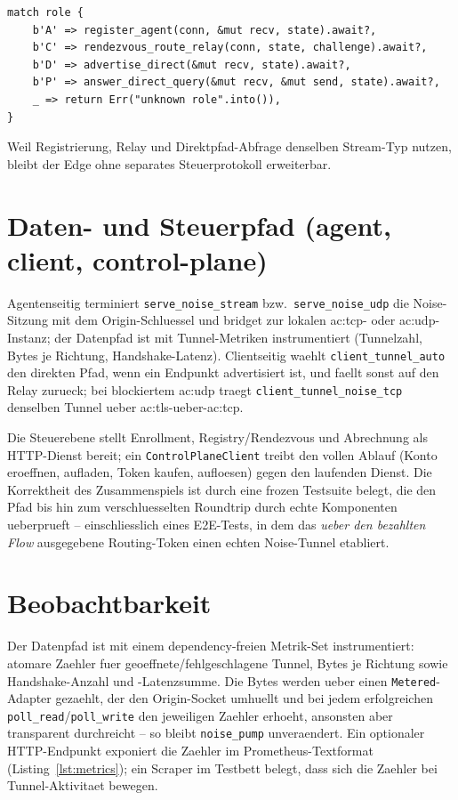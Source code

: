 \begin{lstlisting}[caption={Rollen-Dispatch (vereinfacht).},label=lst:dispatch]
match role {
    b'A' => register_agent(conn, &mut recv, state).await?,
    b'C' => rendezvous_route_relay(conn, state, challenge).await?,
    b'D' => advertise_direct(&mut recv, state).await?,
    b'P' => answer_direct_query(&mut recv, &mut send, state).await?,
    _ => return Err("unknown role".into()),
}
\end{lstlisting}

Weil Registrierung, Relay und Direktpfad-Abfrage denselben Stream-Typ nutzen,
bleibt der Edge ohne separates Steuerprotokoll erweiterbar.

\section{Daten- und Steuerpfad (agent, client, control-plane)}
\label{sec:impl-datenpfad}

Agentenseitig terminiert \texttt{serve\_noise\_stream} bzw.\
\texttt{serve\_noise\_udp} die Noise-Sitzung mit dem Origin-Schluessel und
bridget zur lokalen \gls{ac:tcp}- oder \gls{ac:udp}-Instanz; der Datenpfad ist
mit Tunnel-Metriken instrumentiert (Tunnelzahl, Bytes je Richtung,
Handshake-Latenz). Clientseitig waehlt \texttt{client\_tunnel\_auto} den direkten
Pfad, wenn ein Endpunkt advertisiert ist, und faellt sonst auf den Relay zurueck;
bei blockiertem \gls{ac:udp} traegt \texttt{client\_tunnel\_noise\_tcp} denselben
Tunnel ueber \gls{ac:tls}-ueber-\gls{ac:tcp}.

Die Steuerebene stellt Enrollment, Registry/Rendezvous und Abrechnung als
HTTP-Dienst bereit; ein \texttt{ControlPlaneClient} treibt den vollen Ablauf
(Konto eroeffnen, aufladen, Token kaufen, aufloesen) gegen den laufenden Dienst.
Die Korrektheit des Zusammenspiels ist durch eine frozen Testsuite belegt, die
den Pfad bis hin zum verschluesselten Roundtrip durch echte Komponenten
ueberprueft -- einschliesslich eines E2E-Tests, in dem das \emph{ueber den
bezahlten Flow} ausgegebene Routing-Token einen echten Noise-Tunnel etabliert.

\section{Beobachtbarkeit}
\label{sec:impl-observability}

Der Datenpfad ist mit einem dependency-freien Metrik-Set instrumentiert:
atomare Zaehler fuer geoeffnete/fehlgeschlagene Tunnel, Bytes je Richtung sowie
Handshake-Anzahl und -Latenzsumme. Die Bytes werden ueber einen
\texttt{Metered}-Adapter gezaehlt, der den Origin-Socket umhuellt und bei jedem
erfolgreichen \texttt{poll\_read}/\texttt{poll\_write} den jeweiligen Zaehler
erhoeht, ansonsten aber transparent durchreicht -- so bleibt \texttt{noise\_pump}
unveraendert. Ein optionaler HTTP-Endpunkt exponiert die Zaehler im
Prometheus-Textformat (Listing~\ref{lst:metrics}); ein Scraper im Testbett
belegt, dass sich die Zaehler bei Tunnel-Aktivitaet bewegen.

